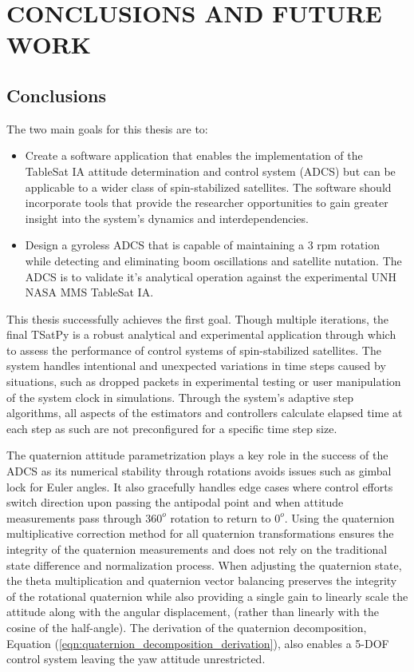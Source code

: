 \chapter{CONCLUSIONS AND FUTURE WORK}
\label{chap:Conclusions}

\section{Conclusions}

The two main goals for this thesis are to:

\begin{itemize}
\item Create a software application that enables the implementation of the TableSat IA attitude determination and control system (ADCS) but can be applicable to a wider class of spin-stabilized satellites.  The software should incorporate tools that provide the researcher opportunities to gain greater insight into the system's dynamics and interdependencies.
\item Design a gyroless ADCS that is capable of maintaining a 3 rpm rotation while detecting and eliminating boom oscillations and satellite nutation.  The ADCS is to validate it's analytical operation against the experimental UNH NASA MMS TableSat IA.
\end{itemize}

This thesis successfully achieves the first goal.  Though multiple iterations, the final TSatPy is a robust analytical and experimental application through which to assess the performance of control systems of spin-stabilized satellites.  The system handles intentional and unexpected variations in time steps caused by situations, such as dropped packets in experimental testing or user manipulation of the system clock in simulations.  Through the system's adaptive step algorithms, all aspects of the estimators and controllers calculate elapsed time at each step as such are not preconfigured for a specific time step size.

The quaternion attitude parametrization plays a key role in the success of the ADCS as its numerical stability through rotations avoids issues such as gimbal lock for Euler angles.  It also gracefully handles edge cases where control efforts switch direction upon passing the antipodal point and when attitude measurements pass through $360^o$ rotation to return to $0^o$.  Using the quaternion multiplicative correction method for all quaternion transformations ensures the integrity of the quaternion measurements and does not rely on the traditional state difference and normalization process.  When adjusting the quaternion state, the theta multiplication and quaternion vector balancing preserves the integrity of the rotational quaternion while also providing a single gain to linearly scale the attitude along with the angular displacement, (rather than linearly with the cosine of the half-angle).  The derivation of the quaternion decomposition, Equation (\ref{eqn:quaternion_decomposition_derivation}), also enables a 5-DOF control system leaving the yaw attitude unrestricted.


